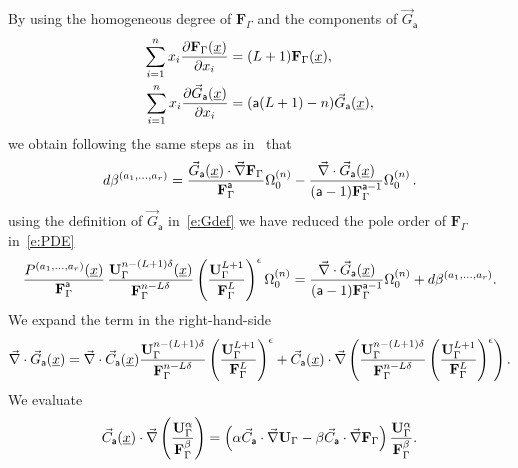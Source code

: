 \documentclass[a4paper,12pt]{article}
\numberwithin{equation}{section}
\numberwithin{figure}{section}
\begin{document}
By using the homogeneous degree of $\mathbf{F}_\Gamma$ and the
components of $\vec G_{\mathsf{a}}$
\begin{align}
  \sum_{i=1}^n x_i {\partial\mathbf{F}_\Gamma (\underline x)\over \partial x_i}&=
                                                                  (L+1) \mathbf{F}_\Gamma (\underline x),\\
   \sum_{i=1}^n x_i {\partial\vec G_{\mathsf{a}}(\underline x)\over \partial x_i}&=
                                                                  (\mathsf{a}(L+1)-n) \vec G_{\mathsf{a}}(\underline x),
\end{align}
we obtain following the same steps as in~\cite{Griffiths_1969} that 
   \begin{equation}
     d\beta^{(a_1,\dots,a_r)}= {  \vec  G_{\mathsf{a}}
     (\underline x)
\cdot    \vec \nabla\textbf{F}_\Gamma\over
     \textbf{F}_\Gamma^{\mathsf{a}}}\Omega_0^{(n)}-{
\vec\nabla \cdot \vec G_{\mathsf{a}}
     (\underline x)
    \over
    (\mathsf{a}-1)\textbf{F}_\Gamma^{\mathsf{a}-1}}
  \Omega_0^{(n)} \,.
\end{equation}
using the definition of $\vec  G_{\mathsf{a}}$ in~\eqref{e:Gdef} we
have reduced the pole order  of $ \textbf{F}_\Gamma$ in~\eqref{e:PDE} 
\begin{equation}
  {  P^{(a_1,\dots,a_r)}(\underline x)\over \textbf{F}_\Gamma^{\mathsf{a}}}\, { \textbf{U}_\Gamma^{n-(L+1)\delta} (\underline x)\over \textbf{F}_\Gamma^{n-L\delta}}
  \left(\textbf{U}_\Gamma^{L+1}\over \textbf{F}_\Gamma^L\right)^{\epsilon} \Omega^{(n)}_0={
\vec\nabla \cdot \vec G_{\mathsf{a}}
     (\underline x)
    \over
    (\mathsf{a}-1)\textbf{F}_\Gamma^{\mathsf{a}-1}}
  \Omega_0^{(n)}+d\beta^{(a_1,\dots,a_r)}.
\end{equation}
We expand the term in the right-hand-side
\begin{multline}
  \vec\nabla \cdot \vec G_{\mathsf{a}}(\underline x)=  \vec\nabla \cdot \vec C_{\mathsf{a}}(\underline x) {\textbf{U}_\Gamma^{n-(L+1)\delta}\over
  \textbf{F}_\Gamma^{n-L\delta}} \left(\mathbf{U}_\Gamma^{L+1}\over
  \mathbf{F}_\Gamma^L\right)^\epsilon
+
  \vec C_{\mathsf{a}}(\underline x) \cdot\vec\nabla  \left(  {\textbf{U}_\Gamma^{n-(L+1)\delta}\over
  \textbf{F}_\Gamma^{n-L\delta}} \left(\mathbf{U}_\Gamma^{L+1}\over
  \mathbf{F}_\Gamma^L\right)^\epsilon\right) .
\end{multline}
%
We evaluate
\begin{equation}
  \vec C_{\mathsf{a}}(\underline x)\cdot \vec\nabla \left(\mathbf{U}_\Gamma^{\alpha}\over
\mathbf{F}_\Gamma^\beta\right)=\left(\alpha \vec
C_{\mathsf{a}}\cdot \vec\nabla \mathbf{U}_\Gamma -\beta \vec
C_{\mathsf{a}}\cdot \vec\nabla \mathbf{F}_\Gamma\right) {\mathbf{U}_\Gamma^{\alpha}\over
\mathbf{F}_\Gamma^\beta}.
\end{equation}
\end{document}
